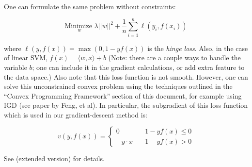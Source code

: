 One can formulate the same problem without constraints: 

\begin{equation}
\underset{w}{\text{Minimize }} \lambda ||w||^2 + \frac{1}{n}\sum_{i=1}^n \ell(y_i,f(x_i))
\end{equation}


where $\ell(y,f(x)) = \max(0,1-yf(x))$ is the \textit{hinge loss}. Also, in the case of linear SVM, $f(x) = \langle w, x\rangle + b$ (Note: there are a couple ways to handle the variable $b$; one can include it in the gradient calculations, or add extra feature to the data space.) Also note that this loss function is not smooth. However, one can solve this unconstrained convex problem using the techniques outlined in the ``Convex Programming Framework'' section of this document, for example using IGD (see paper by Feng, et al). In particular, the subgradient of this loss function which is used in our gradient-descent method is:

$$
v(y,f(x)) = \left\{
        \begin{array}{ll}
            0 & \quad 1-yf(x) \leq 0 \\
            -y\cdot x & \quad  1-yf(x) > 0
        \end{array}
    \right.
$$

See \cite{ShSS07} (extended version) for details.

 
 
%
%
%


